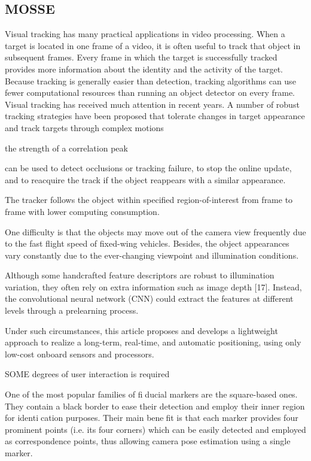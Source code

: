 \documentclass[a4paper]{report}
\begin{document}
\subsection{MOSSE}
Visual tracking has many practical applications in video processing. When a target is located in one frame of a video, it is often useful to track that object in subsequent frames. Every frame in which the target is successfully
tracked provides more information about the identity
and the activity of the target. Because tracking is generally easier than detection, tracking algorithms can use fewer computational resources than running an object detector on every frame.
Visual tracking has received much attention in recent years. A number of robust tracking strategies have been proposed that tolerate changes in target appearance and
track targets through complex motions

the strength of a correlation peak

can be used to detect occlusions or tracking failure, to stop the online update, and to reacquire the track if the object reappears with a similar appearance.

The tracker follows the object within specified region-of-interest from
frame to frame with lower computing consumption.

One difficulty is that the objects may move out of the camera view frequently due to the fast flight speed of fixed-wing vehicles. Besides, the object appearances vary constantly due to the ever-changing viewpoint and illumination conditions.

Although some handcrafted feature descriptors are robust to illumination variation, they often rely on extra information such as image depth [17]. Instead, the
convolutional neural network (CNN) could extract the features
at different levels through a prelearning process.

Under such circumstances, this article proposes and develops
a lightweight approach to realize a long-term, real-time, and
automatic positioning, using only low-cost onboard sensors and
processors.


SOME degrees of user interaction is required



One of the most popular families of fiducial markers are
the square-based ones. They contain a black border to ease
their detection and employ their inner region for identication
purposes. Their main benefit is that each marker provides
four prominent points (i.e. its four corners) which can
be easily detected and employed as correspondence points,
thus allowing camera pose estimation using a single marker.
\end{document}
